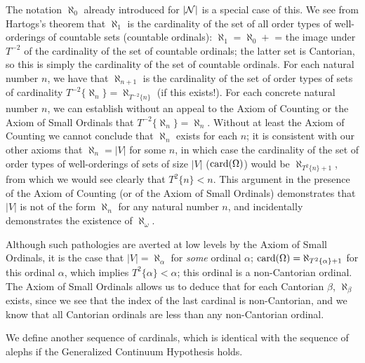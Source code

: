 The notation $\aleph_0$ already introduced for $|{\cal N}|$ is a
special case of this.  We see from Hartogs's theorem that $\aleph_1$
is the cardinality of the set of all order types of
well-orderings of 
countable sets (countable ordinals):
$\aleph_1 = \aleph_0+$ = the 
image under $T^{-2}$ of the cardinality of the set of countable
ordinals; the latter set is Cantorian, so this is simply
the 
cardinality of the set of countable ordinals.  For each
natural number 
$n$, we have that $\aleph_{n+1}$ is the cardinality of the set of
order types of sets of cardinality $T^{-2}\{\aleph_n\} =
\aleph_{T^{-2}\{n\}}$ (if this exists!).  For each concrete natural
number $n$, we can establish without an appeal to the Axiom of
Counting or the Axiom of Small Ordinals that $T^{-2}\{\aleph_n\} = 
\aleph_n$.  Without at least the Axiom of Counting we cannot conclude
that $\aleph_n$ exists for each $n$; it is consistent with our other
axioms that $\aleph_n = |V|$ for some $n$, in which case the
cardinality of the set of order types of
well-orderings of sets of 
size $|V|$ ($\mathop{\mathrm{card}}(\Omega)$) would be $\aleph_{T^2\{n\}+1}$, from which
we would see clearly that $T^2\{n\} < n$.  This argument in the
presence of the Axiom of Counting (or of the Axiom of Small Ordinals)
demonstrates that $|V|$ is not of the form $\aleph_n$ for any natural
number $n$, and incidentally demonstrates the existence of
$\aleph_{\omega}$.

Although such pathologies are averted at low levels by the Axiom of
Small Ordinals, it is the case that $|V| =
\aleph_{\alpha}$ for {\itshape some\/} 
ordinal $\alpha$; $\mathop{\mathrm{card}}(\Omega) = \aleph_{T^2\{\alpha\}+1}$ for this
ordinal $\alpha$, which implies $T^2\{\alpha\} < \alpha$; this ordinal
is a non-Cantorian ordinal.  The Axiom of Small
Ordinals allows us to deduce that for each Cantorian $\beta$, $\aleph_{\beta}$
exists, since we see that the index of the last cardinal is non-Cantorian, and we know that all Cantorian
ordinals are less than any non-Cantorian 
ordinal.

We define another sequence of cardinals, which is
identical with the sequence of alephs if the Generalized Continuum
Hypothesis holds.


